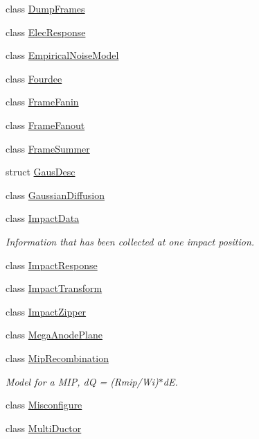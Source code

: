 \begin{DoxyCompactItemize}
\item 
class \hyperlink{class_wire_cell_1_1_gen_1_1_dump_frames}{Dump\+Frames}
\item 
class \hyperlink{class_wire_cell_1_1_gen_1_1_elec_response}{Elec\+Response}
\item 
class \hyperlink{class_wire_cell_1_1_gen_1_1_empirical_noise_model}{Empirical\+Noise\+Model}
\item 
class \hyperlink{class_wire_cell_1_1_gen_1_1_fourdee}{Fourdee}
\item 
class \hyperlink{class_wire_cell_1_1_gen_1_1_frame_fanin}{Frame\+Fanin}
\item 
class \hyperlink{class_wire_cell_1_1_gen_1_1_frame_fanout}{Frame\+Fanout}
\item 
class \hyperlink{class_wire_cell_1_1_gen_1_1_frame_summer}{Frame\+Summer}
\item 
struct \hyperlink{struct_wire_cell_1_1_gen_1_1_gaus_desc}{Gaus\+Desc}
\item 
class \hyperlink{class_wire_cell_1_1_gen_1_1_gaussian_diffusion}{Gaussian\+Diffusion}
\item 
class \hyperlink{class_wire_cell_1_1_gen_1_1_impact_data}{Impact\+Data}
\begin{DoxyCompactList}\small\item\em Information that has been collected at one impact position. \end{DoxyCompactList}\item 
class \hyperlink{class_wire_cell_1_1_gen_1_1_impact_response}{Impact\+Response}
\item 
class \hyperlink{class_wire_cell_1_1_gen_1_1_impact_transform}{Impact\+Transform}
\item 
class \hyperlink{class_wire_cell_1_1_gen_1_1_impact_zipper}{Impact\+Zipper}
\item 
class \hyperlink{class_wire_cell_1_1_gen_1_1_mega_anode_plane}{Mega\+Anode\+Plane}
\item 
class \hyperlink{class_wire_cell_1_1_gen_1_1_mip_recombination}{Mip\+Recombination}
\begin{DoxyCompactList}\small\item\em Model for a M\+IP, dQ = (Rmip/\+Wi)$\ast$dE. \end{DoxyCompactList}\item 
class \hyperlink{class_wire_cell_1_1_gen_1_1_misconfigure}{Misconfigure}
\item 
class \hyperlink{class_wire_cell_1_1_gen_1_1_multi_ductor}{Multi\+Ductor}
\item 

\end{DoxyCompactItemize}
